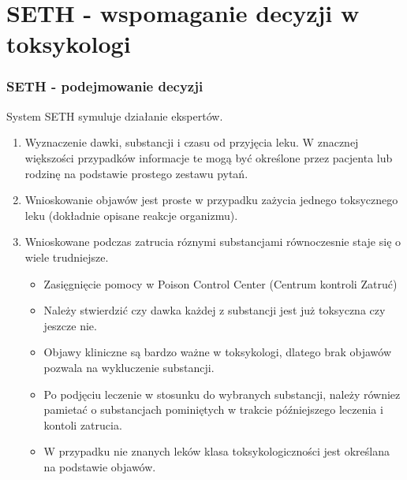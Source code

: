 \section{SETH - wspomaganie decyzji w toksykologi}


\begin{frame}[allowframebreaks]
\frametitle{SETH - podejmowanie decyzji}

System SETH symuluje działanie ekspertów.

\begin{enumerate}
    \item Wyznaczenie dawki, substancji i czasu od przyjęcia leku. W znacznej 
    większości przypadków informacje te mogą być określone przez pacjenta 
    lub rodzinę na podstawie prostego zestawu pytań.
    \item Wnioskowanie objawów jest proste w przypadku zażycia jednego
    toksycznego leku (dokładnie opisane reakcje organizmu).
\framebreak
    \item Wnioskowane podczas zatrucia róznymi substancjami równoczesnie staje
    się o wiele trudniejsze.
    \begin{itemize}
        \item Zasięgnięcie pomocy w Poison Control Center (Centrum kontroli
        Zatruć)
        \item Należy stwierdzić czy dawka każdej z substancji jest już
        toksyczna czy jeszcze nie.
        \item Objawy kliniczne są bardzo ważne w toksykologi, dlatego brak
        objawów pozwala na wykluczenie substancji.
        \item Po podjęciu leczenie w stosunku do wybranych substancji, należy
        równiez pamietać o substancjach pominiętych w trakcie późniejszego
        leczenia i kontoli zatrucia.
        \item W przypadku nie znanych leków klasa toksykologiczności jest
        określana na podstawie objawów.
    \end{itemize}

\end{enumerate}

\end{frame}

